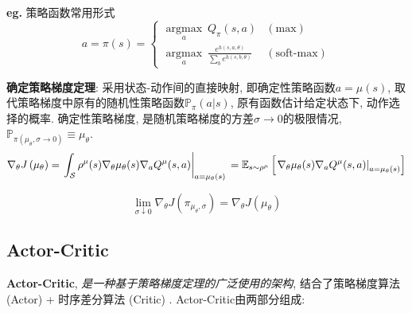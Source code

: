 \documentclass{article}
\begin{document}
        \textbf{eg.} 策略函数常用形式
        \begin{displaymath} a = \pi(s) = \left\{ \begin{array}{lr}
            \underset{a}{\operatorname{argmax}}\ Q_\pi(s, a)    & (\text{max})\\
            \underset{a}{\operatorname{argmax}}\ \frac{e^{h(s, a, \theta)}}{\sum_{b} e^{h(s, b, \theta)}}    & (\text{soft-max})
        \end{array} \right. \end{displaymath}
        
        \textbf{确定策略梯度定理}: 采用状态-动作间的直接映射, 即确定性策略函数$a = \mu(s)$,  取代策略梯度中原有的随机性策略函数$\mathbb P_\pi(a|s)$, 原有函数估计给定状态下, 动作选择的概率. 确定性策略梯度, 是随机策略梯度的方差$\sigma \to 0$的极限情况, $\mathbb P_{\pi(\mu_\theta, \sigma \to 0)} \equiv \mu_\theta$. 
            $$\nabla_{\theta} J\left(\mu_{\theta}\right) =\left.\int_{\mathcal{S}} \rho^{\mu}(s) \nabla_{\theta} \mu_{\theta}(s) \nabla_{a} Q^{\mu}(s, a)\right|_{a=\mu_{\theta}(s)} \\=\mathbb{E}_{s \sim \rho^{\mu}}\left[\left.\nabla_{\theta} \mu_{\theta}(s) \nabla_{a} Q^{\mu}(s, a)\right|_{a=\mu_{\theta}(s)}\right]$$ 
            
            $$\lim _{\sigma \downarrow 0} \nabla_{\theta} J\left(\pi_{\mu_{\theta}, \sigma}\right)=\nabla_{\theta} J\left(\mu_{\theta}\right)$$

    \subsection{Actor-Critic}
        \textbf{Actor-Critic}, \textit{是一种基于策略梯度定理的广泛使用的架构}, 结合了策略梯度算法 (Actor) + 时序差分算法 (Critic) . Actor-Critic由两部分组成:
    
\end{document}
